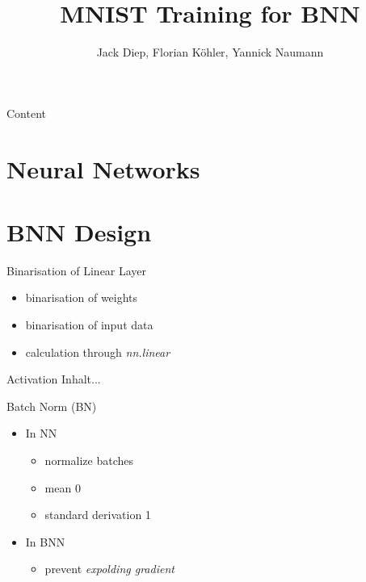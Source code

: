 \documentclass[aspectratio=1610, 12pt]{beamer}
\title{MNIST Training for BNN}
\author[Diep, Köhler, Naumann]{Jack Diep, Florian Köhler, Yannick Naumann}
\institute[BNN-Training]{Design Your Own CPU - Design of Embedded Systems}
\begin{document}
\maketitle




\begin{frame}{Content}
\tableofcontents


\end{frame}
\section{Neural Networks}

\section{BNN Design}
\begin{frame}{Binarisation of Linear Layer}
\begin{itemize}
	\item binarisation of weights
	\item binarisation of input data
	\item calculation through \textit{nn.linear}
\end{itemize}
\end{frame}
\begin{frame}{Activation}
Inhalt...
\end{frame}
\begin{frame}{Batch Norm (BN)}
\begin{itemize}
	\item In NN
	\begin{itemize}
		\item normalize batches 
		\item mean 0
		\item standard derivation 1 
	\end{itemize}
	\item In BNN 
	\begin{itemize}
		\item prevent \textit{expolding gradient} %
	\end{itemize}
\end{itemize}
\end{frame}
\end{document}
